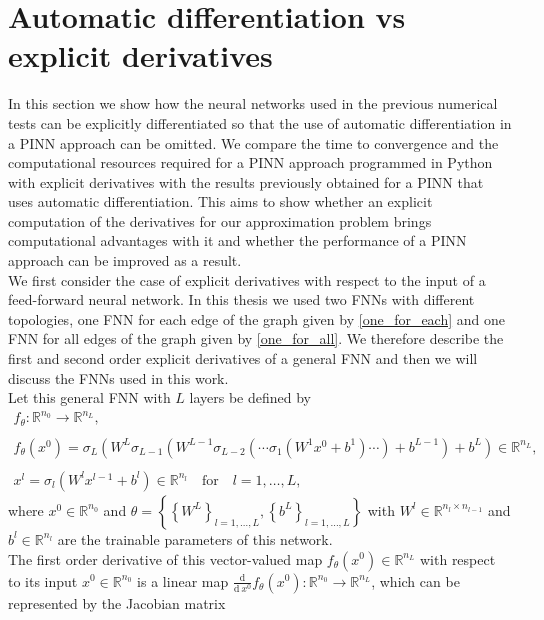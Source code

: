 \section{Automatic differentiation vs explicit derivatives}
\label{ch3:sec3}

In this section we show how the neural networks used in the previous numerical tests can be explicitly differentiated so that the use of automatic differentiation in a PINN approach can be omitted. We compare the time to convergence and the computational resources required for a PINN approach programmed in Python with explicit derivatives with the results previously obtained for a PINN that uses automatic differentiation. This aims to show whether an explicit computation of the derivatives for our approximation problem brings computational advantages with it and whether the performance of a PINN approach can be improved as a result. \\
We first consider the case of explicit derivatives with respect to the input of a feed-forward neural network. In this thesis we used two FNNs with different topologies, one FNN for each edge of the graph given by \cref{one_for_each} and one FNN for all edges of the graph given by \cref{one_for_all}. We therefore describe the first and second order explicit derivatives of a general FNN and then we will discuss the FNNs used in this work. \\
Let this general FNN with $L$ layers be defined by 
\begin{gather}
    \label{model prediction}
    f_{\theta} \colon \mathbb{R}^{n_0} \to \mathbb{R}^{n_L}, \\
    \\
    f_{\theta}\left(x^0\right) = \sigma_L\left(W^L \sigma_{L-1}\left(W^{L-1}\sigma_{L-2}\left(\cdots \sigma_{1}\left(W^{1}x^0 + b^1\right) \cdots\right) + b^{L-1}\right) + b^{L}\right) \in \mathbb{R}^{n_L}, \\
    \\
    x^l = \sigma_l\left(W^l x^{l-1} + b^l\right) \in \mathbb{R}^{n_l} \quad \text{for} \quad l = 1, \ldots, L,
\end{gather}
where $x^0 \in \mathbb{R}^{n_0}$ and $\theta = \left\{ \left\{ W^L \right\}_{l = 1, \ldots, L}, \left\{ b^L \right\}_{l = 1, \ldots, L} \right\}$ with $W^l \in \mathbb{R}^{n_l \times n_{l-1}}$ and $b^l \in \mathbb{R}^{n_l}$ are the trainable parameters of this network. \\
The first order derivative of this vector-valued map $f_{\theta}\left(x^0\right) \in \mathbb{R}^{n_L}$ with respect to its input $x^0 \in \mathbb{R}^{n_0}$ is a linear map $\frac{\mathrm{d}}{\mathrm{d} \ x^0} f_{\theta}\left(x^0\right) \colon \mathbb{R}^{n_0} \to \mathbb{R}^{n_L}$, which can be represented by the Jacobian matrix
